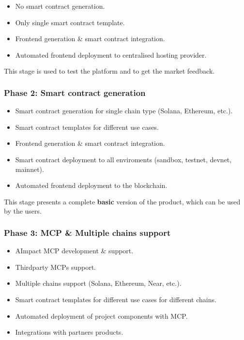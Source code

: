 \documentclass[12pt,a4paper]{article}
\begin{document}
\begin{itemize}
    \item No smart contract generation.
    \item Only single smart contract template.
    \item Frontend generation \& smart contract integration.
    \item Automated frontend deployment to centralised hosting provider.
\end{itemize}

This stage is used to test the platform and to get the market feedback.

\subsubsection{Phase 2: Smart contract generation}

\begin{itemize}
    \item Smart contract generation for single chain type (Solana, Ethereum, etc.).
    \item Smart contract templates for different use cases.
    \item Frontend generation \& smart contract integration.
    \item Smart contract deployment to all enviroments (sandbox, testnet, devnet, mainnet).
    \item Automated frontend deployment to the blockchain.
\end{itemize}

This stage presents a complete \textbf{basic} version of the product, which can be used by the users.


\subsubsection{Phase 3: MCP \& Multiple chains support }

\begin{itemize}
    \item AImpact MCP development \& support.
    \item Thirdparty MCPs support.
    \item Multiple chains support (Solana, Ethereum, Near, etc.).
    \item Smart contract templates for different use cases for different chains.
    \item Automated deployment of project components with MCP.
    \item Integrations with partners products.
\end{itemize}
\end{document}
